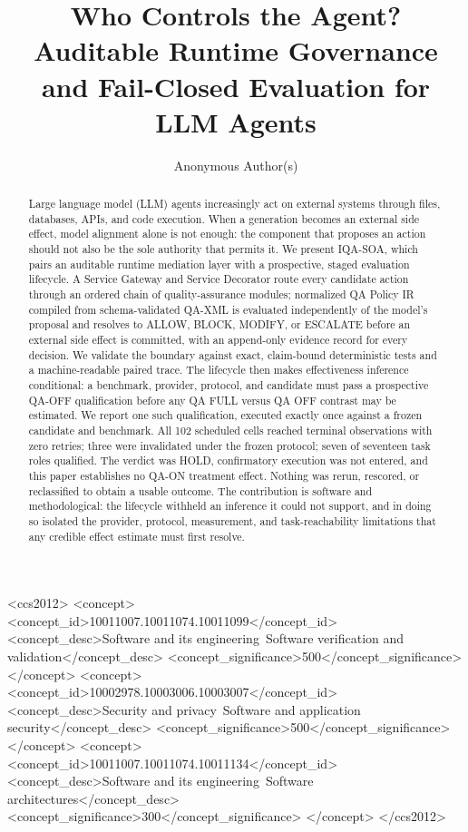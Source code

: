 \documentclass[acmsmall,screen,review,anonymous]{acmart}
\begin{document}
\title[Who Controls the Agent?]{Who Controls the Agent? Auditable Runtime
Governance and Fail-Closed Evaluation for LLM Agents}

\author{Anonymous Author(s)}

\begin{abstract}
Large language model (LLM) agents increasingly act on external systems through
files, databases, APIs, and code execution. When a generation becomes an
external side effect, model alignment alone is not enough: the component that
proposes an action should not also be the sole authority that permits it. We
present IQA-SOA, which pairs an auditable runtime mediation layer with a
prospective, staged evaluation lifecycle. A Service Gateway and Service
Decorator route every candidate action through an ordered chain of
quality-assurance modules; normalized QA Policy IR compiled from schema-validated
QA-XML is evaluated independently of the model's proposal and resolves to ALLOW, BLOCK,
MODIFY, or ESCALATE before an external side effect is committed, with an
append-only evidence record for every decision. We validate the boundary against
exact, claim-bound deterministic tests and a machine-readable paired trace. The lifecycle
then makes effectiveness inference conditional: a benchmark, provider, protocol,
and candidate must pass a prospective QA-OFF qualification before any QA FULL
versus QA OFF contrast may be estimated. We report one such qualification,
executed exactly once against a frozen candidate and benchmark. All 102
scheduled cells reached terminal observations with zero retries; three were
invalidated under the frozen protocol; seven of seventeen task roles qualified.
The verdict was HOLD, confirmatory execution was not entered, and this paper
establishes no QA-ON treatment effect. Nothing was rerun, rescored, or
reclassified to obtain a usable outcome. The contribution is software and
methodological: the lifecycle withheld an inference it could not support, and in
doing so isolated the provider, protocol, measurement, and task-reachability
limitations that any credible effect estimate must first resolve.
\end{abstract}

\begin{CCSXML}
<ccs2012>
<concept>
<concept_id>10011007.10011074.10011099</concept_id>
<concept_desc>Software and its engineering~Software verification and validation</concept_desc>
<concept_significance>500</concept_significance>
</concept>
<concept>
<concept_id>10002978.10003006.10003007</concept_id>
<concept_desc>Security and privacy~Software and application security</concept_desc>
<concept_significance>500</concept_significance>
</concept>
<concept>
<concept_id>10011007.10011074.10011134</concept_id>
<concept_desc>Software and its engineering~Software architectures</concept_desc>
<concept_significance>300</concept_significance>
</concept>
</ccs2012>
\end{CCSXML}
\end{document}
